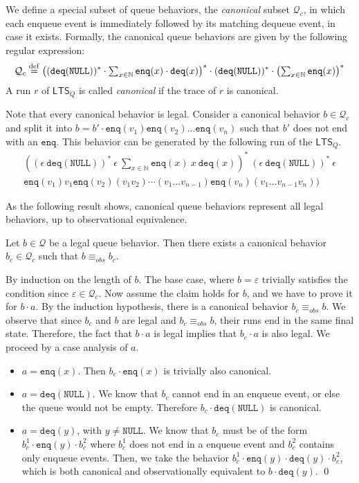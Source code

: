 \documentclass{LMCS}
\newcommand{\NULL}{\ensuremath{\mathtt{NULL}}}
\newcommand{\enq}{\ensuremath{\mathtt{enq}}}
\newcommand{\deq}{\ensuremath{\mathtt{deq}}}
\newcommand{\ltsq}{\ensuremath{{\mathsf{LTS}}_Q}}
\newcommand{\qbehavset}{\ensuremath{\mathcal{Q}}}
\newcommand{\qbehavsetx}[1]{\ensuremath{\qbehavset_{#1}}}
\newcommand{\obsequiv}{\ensuremath{\equiv_{\mathit{obs}}}}
\newcommand\mylabel[1]{\label{#1}}
\begin{document}
We define a special subset of queue behaviors, the {\em canonical} subset $\qbehavsetx c$, in which each enqueue event is immediately followed by its matching dequeue event, in case it exists.
Formally, the canonical queue behaviors are given by the following regular expression:
\[
\qbehavsetx c \stackrel{\rm def}{=} 
\left( (\deq(\NULL))^* \cdot \textstyle\sum_{x\in\mathbb{N}}\enq(x) \cdot \deq(x) \right)^* 
  \cdot (\deq(\NULL))^* \cdot \left(\textstyle\sum_{x\in\mathbb{N}}\enq(x)\right)^*
\]
A run $r$ of {\ltsq} is called {\em canonical} if the trace of $r$ is canonical.

Note that every canonical behavior is legal. Consider a canonical behavior $b \in \qbehavsetx c$ 
and split it into $b = b' \cdot \enq(v_1) \enq(v_2) \ldots \enq(v_n)$ 
such that $b'$ does not end with an $\enq$.
This behavior can be generated by the following run of the $\ltsq$.
\[
\begin{array}{l}
\left( (\epsilon\ \deq(\NULL))^*\ \epsilon\ \textstyle\sum_{x\in\mathbb{N}}\enq(x)\ x\ \deq(x) \right)^*\ 
  (\epsilon\ \deq(\NULL))^*\ \epsilon \\
  \enq(v_1) v_1 \enq(v_2) (v_1v_2) \cdots (v_1\ldots v_{n-1}) \enq(v_n) (v_1\ldots v_{n-1}v_n))
\end{array}
\]

As the following result shows, canonical queue behaviors represent all legal behaviors, up to observational equivalence.

\begin{lem}\mylabel{lem:canonical-representative}
Let $b\in\qbehavset$ be a legal queue behavior.
Then there exists a canonical behavior $b_c\in \qbehavsetx c$ such that $b \obsequiv b_c$.
\end{lem}

\proof
By induction on the length of $b$.
The base case, where $b=\varepsilon$ trivially satisfies the condition since $\varepsilon\in\qbehavsetx c$.
Now assume the claim holds for $b$, and we have to prove it for $b\cdot a$.
By the induction hypothesis, there is a canonical behavior $b_c \obsequiv b$.
We observe that since $b_c$ and $b$ are legal and $b_c \obsequiv b$, their runs 
end in the same final state. Therefore, the fact that $b\cdot a$ is legal implies
that $b_c\cdot a$ is also legal.
We proceed by a case analysis of $a$.
\begin{itemize}
\item $a=\enq(x)$. Then $b_c \cdot \enq(x)$ is trivially also canonical.
\item $a=\deq(\NULL)$.
We know that $b_c$ cannot end in an enqueue event, or else the queue would not
be empty. Therefore $b_c \cdot \deq(\NULL)$ is canonical.
\item $a=\deq(y)$, with $y\neq\NULL$.
We know that $b_c$ must be of the form $b^1_c \cdot \enq(y) \cdot b^2_c$ 
where $b^1_c$ does not end in a enqueue event and $b^2_c$ contains only 
enqueue events.
Then, we take the behavior $b^1_c \cdot \enq(y) \cdot \deq(y) \cdot b^2_c$,
which is both canonical and observationally equivalent to $b \cdot \deq(y)$.
\qed
\end{itemize}
\end{document}
